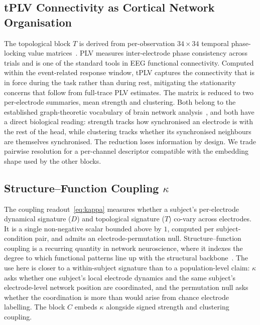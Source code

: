 \documentclass[journal]{IEEEtran}
\begin{document}
\subsection{tPLV Connectivity as Cortical Network Organisation}
The topological block $T$ is derived from per-observation $34\times34$ temporal phase-locking value matrices~\cite{lachaux1999plv}. PLV measures inter-electrode phase consistency across trials and is one of the standard tools in EEG functional connectivity. Computed within the event-related response window, tPLV captures the connectivity that is in force during the task rather than during rest, mitigating the stationarity concerns that follow from full-trace PLV estimates. The matrix is reduced to two per-electrode summaries, mean strength and clustering. Both belong to the established graph-theoretic vocabulary of brain network analysis~\cite{bullmore2009complex}, and both have a direct biological reading: strength tracks how synchronised an electrode is with the rest of the head, while clustering tracks whether its synchronised neighbours are themselves synchronised. The reduction loses information by design. We trade pairwise resolution for a per-channel descriptor compatible with the embedding shape used by the other blocks.

\subsection{Structure--Function Coupling $\kappa$}
The coupling readout~\eqref{eq:kappa} measures whether a subject's per-electrode dynamical signature ($D$) and topological signature ($T$) co-vary across electrodes. It is a single non-negative scalar bounded above by $1$, computed per subject-condition pair, and admits an electrode-permutation null. Structure--function coupling is a recurring quantity in network neuroscience, where it indexes the degree to which functional patterns line up with the structural backbone~\cite{honey2009structural,park2013structural,suarez2020linking}. The use here is closer to a within-subject signature than to a population-level claim: $\kappa$ asks whether one subject's local electrode dynamics and the same subject's electrode-level network position are coordinated, and the permutation null asks whether the coordination is more than would arise from chance electrode labelling. The block $C$ embeds $\kappa$ alongside signed strength and clustering coupling.
\end{document}
